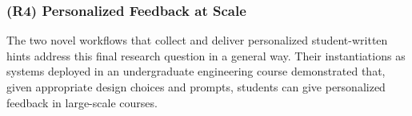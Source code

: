 \subsubsection{(R4) Personalized Feedback at Scale}
The two novel workflows that collect and deliver personalized student-written hints address this final research question in a general way. Their instantiations as systems deployed in an undergraduate engineering course demonstrated that, given appropriate design choices and prompts, students can give personalized feedback in large-scale courses.

